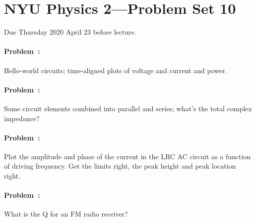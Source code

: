 \documentclass[12pt]{article}
\begin{document}
\section*{NYU Physics 2---Problem Set 10}

Due Thursday 2020 April 23 before lecture.

\paragraph{Problem~\theproblem:}%
Hello-world circuits; time-aligned plots of voltage and current and power.

\paragraph{Problem~\theproblem:}%
Some circuit elements combined into parallel and series; what's the
total complex impedance?

\paragraph{Problem~\theproblem:}%
Plot the amplitude and phase of the current in the LRC AC circuit as a
function of driving frequency. Get the limits right, the peak height
and peak location right.

\paragraph{Problem~\theproblem:}%
What is the Q for an FM radio receiver?
\end{document}

